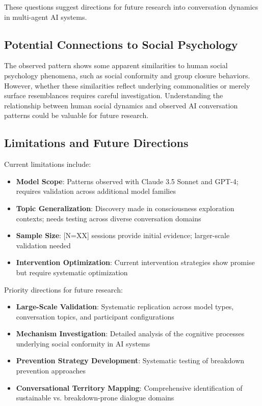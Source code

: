 \documentclass[11pt,letterpaper]{article}
\newcommand{\totalSessions}{[N=XX]} %
\begin{document}
These questions suggest directions for future research into conversation dynamics in multi-agent AI systems.

\subsection{Potential Connections to Social Psychology}

The observed pattern shows some apparent similarities to human social psychology phenomena, such as social conformity and group closure behaviors. However, whether these similarities reflect underlying commonalities or merely surface resemblances requires careful investigation. Understanding the relationship between human social dynamics and observed AI conversation patterns could be valuable for future research.

\subsection{Limitations and Future Directions}

Current limitations include:

\begin{itemize}
    \item \textbf{Model Scope}: Patterns observed with Claude 3.5 Sonnet and GPT-4; requires validation across additional model families
    \item \textbf{Topic Generalization}: Discovery made in consciousness exploration contexts; needs testing across diverse conversation domains
    \item \textbf{Sample Size}: \totalSessions{} sessions provide initial evidence; larger-scale validation needed
    \item \textbf{Intervention Optimization}: Current intervention strategies show promise but require systematic optimization
\end{itemize}

Priority directions for future research:

\begin{itemize}
    \item \textbf{Large-Scale Validation}: Systematic replication across model types, conversation topics, and participant configurations
    \item \textbf{Mechanism Investigation}: Detailed analysis of the cognitive processes underlying social conformity in AI systems
    \item \textbf{Prevention Strategy Development}: Systematic testing of breakdown prevention approaches
    \item \textbf{Conversational Territory Mapping}: Comprehensive identification of sustainable vs. breakdown-prone dialogue domains
\end{itemize}
\end{document}

